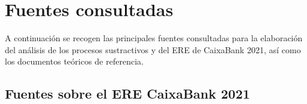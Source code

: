 %

\chapter*{Fuentes consultadas}

A continuación se recogen las principales fuentes consultadas para la
elaboración del análisis de los procesos sustractivos y del ERE de
CaixaBank 2021, así como los documentos teóricos de referencia.

\section*{Fuentes sobre el ERE CaixaBank 2021}

